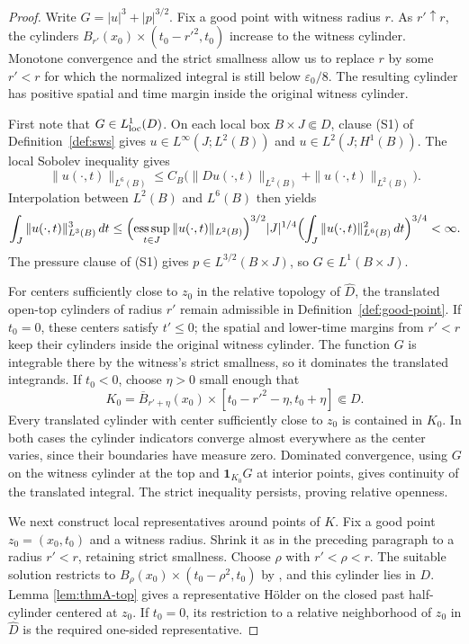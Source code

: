 \documentclass[11pt,letterpaper]{article}
\numberwithin{equation}{section}
\theoremstyle{plain}
\theoremstyle{definition}
\theoremstyle{remark}
\begin{document}
\begin{proof}
Write $G=|u|^3+|p|^{3/2}$.  Fix a good point with witness radius $r$.
As $r'\uparrow r$, the cylinders
$B_{r'}(x_0)\times(t_0-r'^2,t_0)$ increase to the witness cylinder.
Monotone convergence and the strict smallness allow us to replace $r$ by
some $r'<r$ for which the normalized integral is still below
$\varepsilon_0/8$.  The resulting cylinder has positive spatial and time
margin inside the original witness cylinder.

First note that $G\in L^1_{\rm loc}(D)$.  On each local box
$B\times J\Subset D$, clause (S1) of Definition~\ref{def:sws} gives
$u\in L^\infty(J;L^2(B))$ and $u\in L^2(J;H^1(B))$.  The local Sobolev
inequality gives
\[
 \|u(\cdot,t)\|_{L^6(B)}
 \le C_B\bigl(\|Du(\cdot,t)\|_{L^2(B)}+\|u(\cdot,t)\|_{L^2(B)}\bigr).
\]
Interpolation between $L^2(B)$ and $L^6(B)$ then yields
\[
 \int_J\|u(\cdot,t)\|_{L^3(B)}^3\,dt
 \le \Bigl(\mathop{\rm ess\,sup}_{t\in J}\|u(\cdot,t)\|_{L^2(B)}\Bigr)^{3/2}
       |J|^{1/4}
       \Bigl(\int_J\|u(\cdot,t)\|_{L^6(B)}^2\,dt\Bigr)^{3/4}<\infty.
\]
The pressure clause of (S1) gives $p\in L^{3/2}(B\times J)$, so
$G\in L^1(B\times J)$.

For centers sufficiently close to $z_0$ in the relative topology of
$\widehat D$, the translated open-top cylinders of radius $r'$ remain
admissible in Definition~\ref{def:good-point}.  If $t_0=0$, these centers
satisfy $t'\le0$; the spatial and lower-time margins from $r'<r$ keep their
cylinders inside the original witness cylinder.  The function $G$ is
integrable there by the witness's strict smallness, so it dominates the
translated integrands.  If $t_0<0$, choose $\eta>0$ small enough that
\[
 K_0=\overline B_{r'+\eta}(x_0)\times
       [t_0-r'^2-\eta,t_0+\eta]\Subset D.
\]
Every translated cylinder with center sufficiently close to $z_0$ is
contained in $K_0$.  In both cases the cylinder indicators converge almost
everywhere as the center varies, since their boundaries have measure zero.
Dominated convergence, using $G$ on the witness cylinder at the top and
$\mathbf 1_{K_0}G$ at interior points, gives continuity of the translated
integral.  The strict inequality persists, proving relative openness.

We next construct local representatives around points of $K$.  Fix a good
point $z_0=(x_0,t_0)$ and a witness radius.  Shrink it as in the preceding
paragraph to a radius $r'<r$, retaining strict smallness.  Choose
$\rho$ with $r'<\rho<r$.  The suitable solution restricts to
$B_\rho(x_0)\times(t_0-\rho^2,t_0)$ by
\cite[Lemma~11.5]{CKNLean}, and this cylinder lies in $D$.  Lemma
\ref{lem:thmA-top} gives a representative Hölder on the closed past
half-cylinder centered at $z_0$.  If $t_0=0$, its restriction to a
relative neighborhood of $z_0$ in $\widehat D$ is the required one-sided
representative.


\end{proof}
\end{document}
